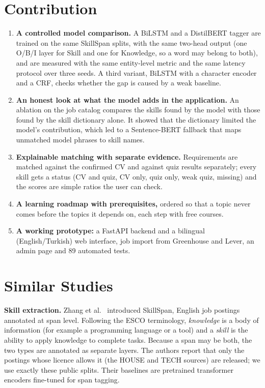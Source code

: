 \documentclass[runningheads]{llncs}
\begin{document}
\section{Contribution}\label{sec:contrib}
\begin{enumerate}
\item \textbf{A controlled model comparison.} A BiLSTM and a DistilBERT tagger are trained on the same
SkillSpan splits, with the same two-head output (one O/B/I layer for Skill and one for Knowledge, so a
word may belong to both), and are measured with the same entity-level metric and the same latency
protocol over three seeds. A third variant, BiLSTM with a character encoder and a CRF, checks whether
the gap is caused by a weak baseline.
\item \textbf{An honest look at what the model adds in the application.} An ablation on the job catalog
compares the skills found by the model with those found by the skill dictionary alone. It showed that
the dictionary limited the model's contribution, which led to a Sentence-BERT fallback that maps
unmatched model phrases to skill names.
\item \textbf{Explainable matching with separate evidence.} Requirements are matched against the
confirmed CV and against quiz results separately; every skill gets a status (CV and quiz, CV only,
quiz only, weak quiz, missing) and the scores are simple ratios the user can check.
\item \textbf{A learning roadmap with prerequisites,} ordered so that a topic never comes before the
topics it depends on, each step with free courses.
\item \textbf{A working prototype:} a FastAPI backend and a bilingual (English/Turkish) web interface,
job import from Greenhouse and Lever, an admin page and 89 automated tests.
\end{enumerate}

\section{Similar Studies}\label{sec:related}
\textbf{Skill extraction.} Zhang et al.\ \cite{zhang2022skillspan} introduced SkillSpan, English job
postings annotated at span level. Following the ESCO terminology, \emph{knowledge} is a body of
information (for example a programming language or a tool) and a \emph{skill} is the ability to apply
knowledge to complete tasks. Because a span may be both, the two types are annotated as separate
layers. The authors report that only the postings whose licence allows it (the HOUSE and TECH sources)
are released; we use exactly these public splits. Their baselines are pretrained transformer encoders
fine-tuned for span tagging.
\end{document}
